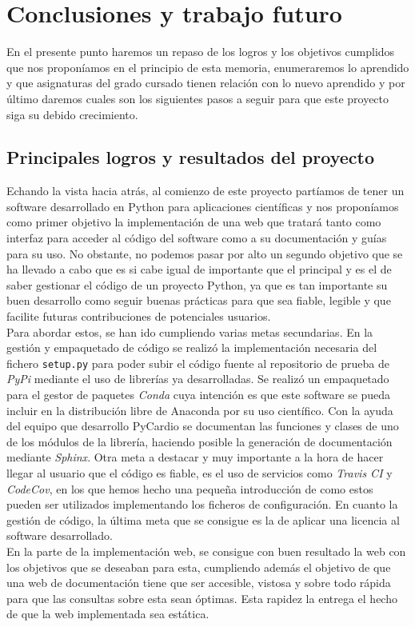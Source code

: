\chapter{Conclusiones y trabajo futuro}
\label{chap:conclusiones}

En el presente punto  haremos un repaso de los logros y los objetivos cumplidos que nos proponíamos en el principio de esta memoria, enumeraremos lo aprendido y que asignaturas del grado cursado tienen relación con lo nuevo aprendido y por último daremos cuales son los siguientes pasos a seguir para que este proyecto siga su debido crecimiento.

\section{Principales logros y resultados del proyecto}
\label{sec:conclus}

Echando la vista hacia atrás, al comienzo de este proyecto partíamos de tener un software desarrollado en Python para aplicaciones científicas y nos proponíamos como primer objetivo la implementación de una web que tratará tanto como interfaz para acceder al código del software como a su documentación y guías para su uso. No obstante, no podemos pasar por alto un segundo objetivo que se ha llevado a cabo que es si cabe igual de importante que el principal y es el de saber gestionar el código de un proyecto Python, ya que es tan importante su buen desarrollo como seguir buenas prácticas para que sea fiable, legible y que facilite futuras contribuciones de potenciales usuarios.\\ 
Para abordar estos, se han ido cumpliendo varias metas secundarias. En la gestión y empaquetado de código se realizó la implementación necesaria del fichero \texttt{setup.py} para poder subir el código fuente al repositorio de prueba de \emph{PyPi} mediante el uso de librerías ya desarrolladas. Se realizó un empaquetado para el gestor de paquetes \emph{Conda} cuya intención es que este software se pueda incluir en la distribución libre de Anaconda por su uso científico. Con la ayuda del equipo que desarrollo PyCardio se documentan las funciones y clases de uno de los módulos de la librería, haciendo posible la generación de documentación mediante \emph{Sphinx}. Otra meta a destacar y muy importante a la hora de hacer llegar al usuario que el código es fiable, es el uso de servicios como \emph{Travis CI} y \emph{CodeCov}, en los que hemos hecho una pequeña introducción de como estos pueden ser utilizados implementando los ficheros de configuración. En cuanto la gestión de código, la última meta que se consigue es la de aplicar una licencia al software desarrollado. \\
En la parte de la implementación web, se consigue con buen resultado la web con los objetivos que se deseaban para esta, cumpliendo además el objetivo de que una web de documentación tiene que ser accesible, vistosa y sobre todo rápida para que las consultas sobre esta sean óptimas. Esta rapidez la entrega el hecho de que la web implementada sea estática.


